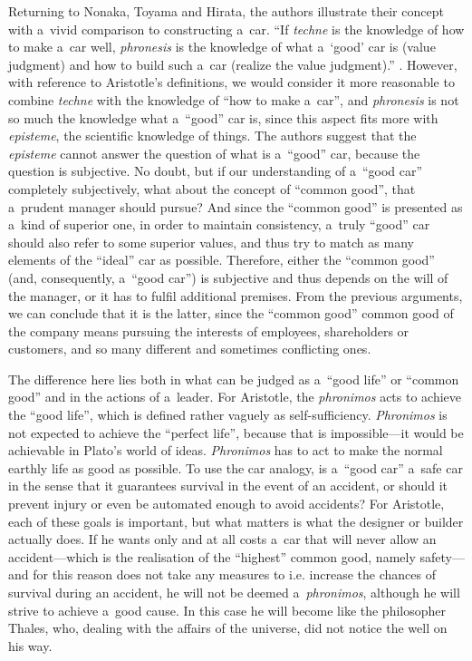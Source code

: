 Returning to Nonaka, Toyama and Hirata, the authors illustrate their concept with a~vivid comparison to constructing a~car. ``If \textit{techne} is the knowledge of how to make a~car well, \textit{phronesis} is the knowledge of what a~‘good' car is (value judgment) and how to build such a~car (realize the value judgment).'' 
\parencite[][p.54]{nonaka_managing_2008}. %
 However, with reference to Aristotle's definitions, we would consider it more reasonable to combine \textit{techne} with the knowledge of ``how to make a~car'', and \textit{phronesis} is not so much the knowledge what a~``good'' car is, since this aspect fits more with \textit{episteme}, the scientific knowledge of things. The authors suggest that the \textit{episteme} cannot answer the question of what is a~``good'' car, because the question is subjective. No doubt, but if our understanding of a~``good car'' completely subjectively, what about the concept of ``common good'', that a~prudent manager should pursue? And since the ``common good'' is presented as a~kind of superior one, in order to maintain consistency, a~truly ``good'' car should also refer to some superior values, and thus try to match as many elements of the ``ideal'' car as possible. Therefore, either the ``common good'' (and, consequently, a~``good car'') is subjective and thus depends on the will of the manager, or it has to fulfil additional premises. From the previous arguments, we can conclude that it is the latter, since the ``common good'' common good of the company means pursuing the interests of employees, shareholders or customers, and so many different and sometimes conflicting ones.



The difference here lies both in what can be judged as a~``good life'' or ``common good'' and in the actions of a~leader. For Aristotle, the \textit{phronimos} acts to achieve the ``good life'', which is defined rather vaguely as self-sufficiency. \textit{Phronimos} is not expected to achieve the ``perfect life'', because that is impossible---it would be achievable in Plato's world of ideas. \textit{Phronimos} has to act to make the normal earthly life as good as possible. To use the car analogy, is a~``good car'' a~safe car in the sense that it guarantees survival in the event of an accident, or should it prevent injury or even be automated enough to avoid accidents? For Aristotle, each of these goals is important, but what matters is what the designer or builder actually does. If he wants only and at all costs a~car that will never allow an accident---which is the realisation of the ``highest'' common good, namely safety---and for this reason does not take any measures to i.e. increase the chances of survival during an accident, he will not be deemed a~\textit{phronimos}, although he will strive to achieve a~good cause. In this case he will become like the philosopher Thales, who, dealing with the affairs of the universe, did not notice the well on his way.



